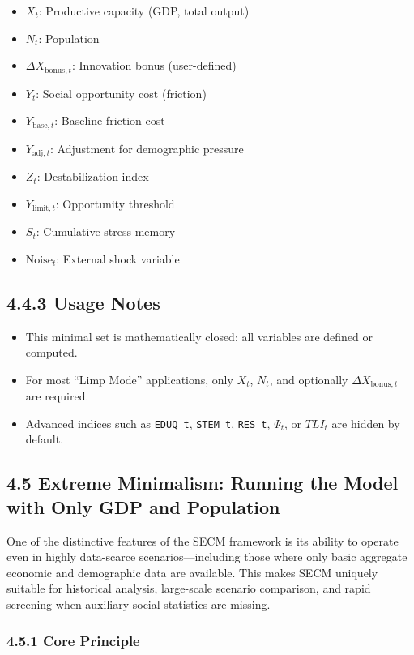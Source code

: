 \documentclass[12pt]{report}
\begin{document}
\begin{itemize}
  \item $X_t$: Productive capacity (GDP, total output)
  \item $N_t$: Population
  \item $\Delta X_{\text{bonus},t}$: Innovation bonus (user-defined)
  \item $Y_t$: Social opportunity cost (friction)
  \item $Y_{\text{base},t}$: Baseline friction cost
  \item $Y_{\text{adj},t}$: Adjustment for demographic pressure
  \item $Z_t$: Destabilization index
  \item $Y_{\text{limit},t}$: Opportunity threshold
  \item $S_t$: Cumulative stress memory
  \item $\text{Noise}_t$: External shock variable
\end{itemize}

\subsection{4.4.3 Usage Notes}

\begin{itemize}
  \item This minimal set is mathematically closed: all variables are defined or computed.
  \item For most ``Limp Mode'' applications, only $X_t$, $N_t$, and optionally $\Delta X_{\text{bonus},t}$ are required.
  \item Advanced indices such as \texttt{EDUQ\_t}, \texttt{STEM\_t}, \texttt{RES\_t}, $\Psi_t$, or $TLI_t$ are hidden by default.
\end{itemize}

\subsection{4.5 Extreme Minimalism: Running the Model with Only GDP and Population}

One of the distinctive features of the SECM framework is its ability to operate even in highly data-scarce scenarios—including those where only basic aggregate economic and demographic data are available. This makes SECM uniquely suitable for historical analysis, large-scale scenario comparison, and rapid screening when auxiliary social statistics are missing.

\subsubsection{4.5.1 Core Principle}
\end{document}
